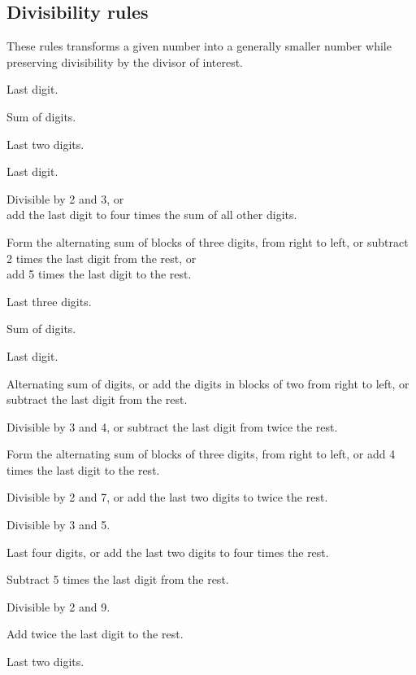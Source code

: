 \subsection{Divisibility rules}
These rules transforms a given number into a generally smaller number while preserving divisibility by the divisor of interest.

\begin{compactenum}
	\scriptsize
	\setcounter{enumi}{1}
	\item Last digit.
	\item Sum of digits.
	\item Last two digits.
	\item Last digit.
	\item Divisible by 2 and 3, or\\
		add the last digit to four times the sum of all other digits.
	\item Form the alternating sum of blocks of three digits, from right to left, or
		subtract 2 times the last digit from the rest, or\\
		add 5 times the last digit to the rest.
	\item Last three digits.
	\item Sum of digits.
	\item Last digit.
	\item Alternating sum of digits, or
		add the digits in blocks of two from right to left, or
		subtract the last digit from the rest.
	\item Divisible by 3 and 4, or
		subtract the last digit from twice the rest.
	\item Form the alternating sum of blocks of three digits, from right to left, or
		add 4 times the last digit to the rest.
	\item Divisible by 2 and 7, or
		add the last two digits to twice the rest.
	\item Divisible by 3 and 5.
	\item Last four digits, or
		add the last two digits to four times the rest.
	\item Subtract 5 times the last digit from the rest.
	\item Divisible by 2 and 9.
	\item Add twice the last digit to the rest.
	\item Last two digits.
\end{compactenum}

